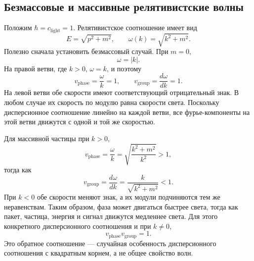 \subsection{Безмассовые и массивные релятивистские волны}

\begin{classroomqa}
\end{classroomqa}

\begin{classroomqa}
\end{classroomqa}

Положим \(\hbar=c_{\mathrm{light}}=1\). Релятивистское соотношение имеет вид
\begin{equation}
E=\sqrt{p^2+m^2},
\qquad
\omega(k)=\sqrt{k^2+m^2}.
\end{equation}
Полезно сначала установить безмассовый случай. При \(m=0\),
\begin{equation}
\omega=|k|.
\end{equation}
На правой ветви, где \(k>0\), \(\omega=k\), и поэтому
\begin{equation}
v_{\mathrm{phase}}=\frac{\omega}{k}=1,
\qquad
v_{\mathrm{group}}=\frac{d\omega}{dk}=1.
\end{equation}
На левой ветви обе скорости имеют соответствующий отрицательный знак. В любом случае их скорость по модулю равна скорости света. Поскольку дисперсионное соотношение линейно на каждой ветви, все фурье-компоненты на этой ветви движутся с одной и той же скоростью.

Для массивной частицы при \(k>0\),
\begin{equation}
v_{\mathrm{phase}}
=\frac{\omega}{k}
=\sqrt{\frac{k^2+m^2}{k^2}}>1,
\end{equation}
тогда как
\begin{equation}
v_{\mathrm{group}}
=\frac{d\omega}{dk}
=\frac{k}{\sqrt{k^2+m^2}}<1.
\end{equation}
При \(k<0\) обе скорости меняют знак, а их модули подчиняются тем же неравенствам. Таким образом, фаза может двигаться быстрее света, тогда как пакет, частица, энергия и сигнал движутся медленнее света. Для этого конкретного дисперсионного соотношения и при \(k\neq0\),
\begin{equation}
v_{\mathrm{phase}}v_{\mathrm{group}}=1.
\end{equation}
Это обратное соотношение — случайная особенность дисперсионного соотношения с квадратным корнем, а не общее свойство волн.

